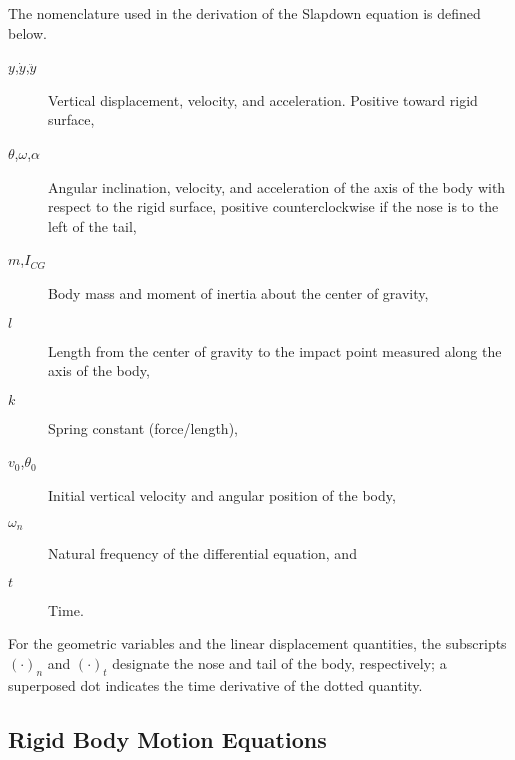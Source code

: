 The nomenclature used in the derivation of the Slapdown equation is
defined below.
\begin{description}
\item[$y$,$\dot y$,$\ddot y$] Vertical displacement, velocity, and
acceleration.  Positive toward rigid surface,
\item[$\theta$,$\omega$,$\alpha$] Angular inclination, velocity, and
acceleration of the axis of the body with respect to the rigid
surface, positive counterclockwise if the nose is to the left of the
tail,
\item[$m$,$I_{CG}$]
Body mass and moment of inertia about the center of
gravity,
\item[$l$]       Length from the center of gravity to the impact point
measured along the axis of the body,
\item[$k$]       Spring constant (force/length),
\item[$v_0$,$\theta_0$]     Initial vertical velocity and angular
position of the body,
\item[$\omega_n$] Natural frequency of the differential equation, and
\item[$t$]        Time.
\end{description}
For the geometric variables and the linear displacement quantities, the
subscripts $(\cdot)_n$ and $(\cdot)_t$ designate the nose and tail
of the body, respectively; a superposed dot indicates the time
derivative of the dotted quantity.

\subsection{Rigid Body Motion Equations}

